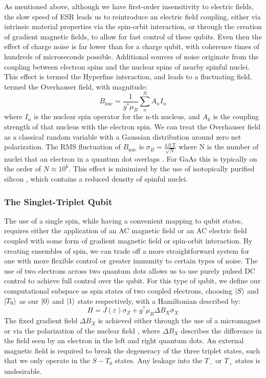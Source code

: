 As mentioned above, although we have first-order insensitivity to electric fields, the slow speed of ESR leads us to
reintroduce an electric field coupling, either via intrinsic material properties via the spin-orbit interaction, or through
the creation of gradient magnetic fields, to allow for fast control of these qubits. Even then the effect of charge noise
is far lower than for a charge qubit, with coherence times of hundreds of microseconds possible. Additional sources
of noise originate from the coupling between electron spins and the nuclear spins of nearby spinful nuclei. This
effect is termed the Hyperfine interaction, and leads to a fluctuating field, termed the Overhauser field, with magnitude:
\begin{equation}
  B_{\textrm{nuc}} = \frac{1}{g^* \mu_B} \sum^N_n A_nI_n
\end{equation}
where $I_n$ is the nuclear spin operator for the n-th nucleus, and $A_k$ is the coupling strength of that nucleus with the
electron spin. We can treat the Overhauser field as a classical random variable with a Gaussian distribution around zero net
polarization. The RMS fluctuation of $B_{\textrm{nuc}}$ is $\sigma_B = \tfrac{\SI{4.0}{\tesla}}{\sqrt{N}}$ where N is the number of
nuclei that an electron in a quantum dot overlaps \cite{PhysRevB.76.035315}. For GaAs this is typically on the order of $N \approx 10^6$.
This effect is minimized by the use of isotopically purified silicon \cite{itoh_watanabe_2014}, which contains a
reduced density of spinful nuclei.

\subsubsection{The Singlet-Triplet Qubit}
The use of a single spin, while having a convenient mapping to qubit states, requires either the application of an AC magnetic field
or an AC electric field coupled with some form of gradient magnetic field or spin-orbit interaction. By creating ensembles of
spin, we can trade off a more straightforward system for one with more flexible control or greater immunity to certain types of noise.
The use of two electrons across two quantum dots allows us to use purely pulsed DC control to achieve full control
over the qubit. For this type of qubit, we define our computational subspace as spin states of two coupled electrons, choosing
$\ket{S}$ and $\ket{T_0}$ as our $\ket{0}$ and $\ket{1}$ state respectively, with a Hamiltonian described by:
\begin{equation}
  H = J(\varepsilon)\sigma_Z + g^* \mu_B \Delta B_X \sigma_X
\end{equation}
The fixed gradient field $\Delta B_X$ is achieved either through the use of a micromagnet or via the polarization of the nuclear
field \cite{PhysRevLett.105.216803}, where $\Delta B_X$ describes the difference in the field seen by an electron in the left and
right quantum dots. An external magnetic field is required to break the degeneracy of the three triplet states, such that
we only operate in the $S-T_0$ states. Any leakage into the $T_-$ or $T_+$ states is undesirable.

